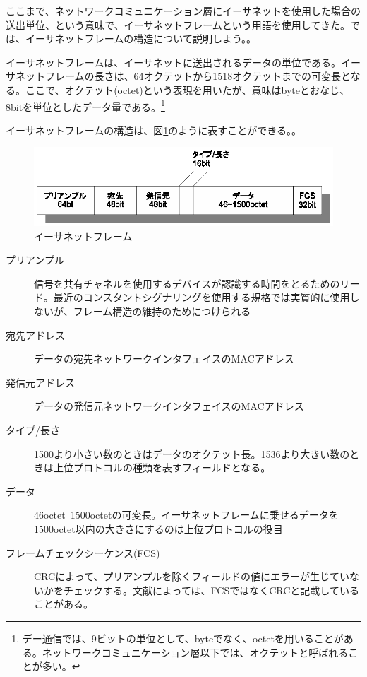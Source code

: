 ここまで、ネットワークコミュニケーション層にイーサネットを使用した場合の送出単位、という意味で、イーサネットフレームという用語を使用してきた。では、イーサネットフレームの構造について説明しよう。。

イーサネットフレームは、イーサネットに送出されるデータの単位である。イーサネットフレームの長さは、64オクテットから1518オクテットまでの可変長となる。ここで、オクテット(octet)という表現を用いたが、意味はbyteとおなじ、8bitを単位としたデータ量である。\footnote{デー通信では、9ビットの単位として、byteでなく、octetを用いることがある。ネットワークコミュニケーション層以下では、オクテットと呼ばれることが多い。}

イーサネットフレームの構造は、図\ref{fig:etherframe}のように表すことができる。。

\begin{figure}[htbp]
	\includegraphics[width=14cm,clip]{draw/ethernetframe.eps}
	\caption{イーサネットフレーム}
	\label{fig:etherframe}
\end{figure}


\begin{description}
\item[プリアンプル]信号を共有チャネルを使用するデバイスが認識する時間をとるためのリード。最近のコンスタントシグナリングを使用する規格では実質的に使用しないが、フレーム構造の維持のためにつけられる
\item[宛先アドレス]データの宛先ネットワークインタフェイスのMACアドレス
\item[発信元アドレス]データの発信元ネットワークインタフェイスのMACアドレス
\item[タイプ/長さ]1500より小さい数のときはデータのオクテット長。1536より大きい数のときは上位プロトコルの種類を表すフィールドとなる。
\item[データ]46octet~1500octetの可変長。イーサネットフレームに乗せるデータを1500octet以内の大きさにするのは上位プロトコルの役目
\item[フレームチェックシーケンス(FCS)]CRCによって、プリアンプルを除くフィールドの値にエラーが生じていないかをチェックする。文献によっては、FCSではなくCRCと記載していることがある。
\end{description}

